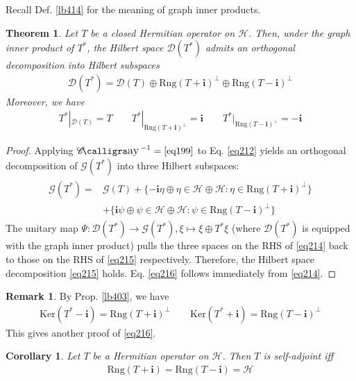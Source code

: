\documentclass[12pt,b5paper,notitlepage]{article}
\theoremstyle{definition}
\newtheorem{rem}[df]{Remark}
\theoremstyle{plain}
\newtheorem{thm}[df]{Theorem}
\newtheorem{co}[df]{Corollary}
\DeclareMathOperator{\Cay}{\mathscr{C}\text{\kern -3pt {\calligra\large ay}}\,}
\newcommand{\Dom}{\mathscr{D}}
\newcommand{\im}{\mathbf{i}}
\newcommand{\Ker}{\mathrm{Ker}}
\newcommand{\Rng}{\mathrm{Rng}}
\newcommand{\MH}{\mathcal H}
\newcommand{\SG}{\mathscr G}
\numberwithin{equation}{section}
\begin{document}
Recall Def. \ref{lb414} for the meaning of graph inner products.

\begin{thm}\label{lb415}
Let $T$ be a closed Hermitian operator on $\MH$. Then, under the graph inner product of $T^*$, the Hilbert space $\Dom(T^*)$ admits an orthogonal decomposition into Hilbert subspaces
\begin{align}\label{eq215}
\Dom(T^*)=\Dom(T)\oplus \Rng(T+\im)^\perp\oplus\Rng(T-\im)^\perp
\end{align}
Moreover, we have
\begin{gather}\label{eq216}
T^*|_{\Dom(T)}=T\qquad T^*|_{\Rng(T+\im)^\perp}=\im\qquad T^*|_{\Rng(T-\im)^\perp}=-\im
\end{gather}
\end{thm}


\begin{proof}
Applying $\Cay^{-1}=\eqref{eq199}$ to Eq. \eqref{eq212} yields an orthogonal decomposition of $\SG(T^*)$ into three Hilbert subspaces:
\begin{align}\label{eq214}
\begin{aligned}
\SG(T^*)=&\SG(T)+\{-\im\eta\oplus\eta\in\MH\oplus\MH:\eta\in\Rng(T+\im)^\perp\}\\
&+\{\im\psi\oplus\psi\in\MH\oplus\MH:\psi\in\Rng(T-\im)^\perp\}
\end{aligned}
\end{align}
The unitary map $\Psi:\Dom(T^*)\rightarrow\SG(T^*),\xi\mapsto\xi\oplus T^*\xi$ (where $\Dom(T^*)$ is equipped with the graph inner product) pulls the three spaces on the RHS of \eqref{eq214} back to those on the RHS of \eqref{eq215} respectively. Therefore, the Hilbert space decomposition \eqref{eq215} holds. Eq. \eqref{eq216} follows immediately from \eqref{eq214}.
\end{proof}


\begin{rem}\label{lb418}
By Prop. \ref{lb403}, we have
\begin{align}
\Ker(T^*-\im)=\Rng(T+\im)^\perp\qquad \Ker(T^*+\im)=\Rng(T-\im)^\perp
\end{align}
This gives another proof of \eqref{eq216}.
\end{rem}



\begin{co}\label{lb420}
Let $T$ be a Hermitian operator on $\MH$. Then $T$ is self-adjoint iff
\begin{align*}
\Rng(T+\im)=\Rng(T-\im)=\MH
\end{align*}
\end{co}
\end{document}
